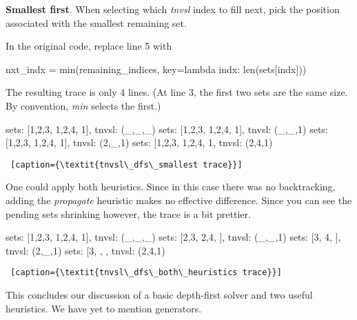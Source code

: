\noindent\textbf{Smallest first}. When selecting which \textit{tnvsl} index to fill next, pick the position associated with the smallest remaining set. 

In the original code, replace line 5 with
\begin{center}
\begin{minipage}[c]{0.45\textwidth}
\begin{python1}
 nxt_indx = min(remaining_indices,
                key=lambda indx: len(sets[indx]))
\end{python1}
\end{minipage}
\end{center}
The resulting trace is only 4 lines. (At line 3, the first two sets are the same size. By convention, \textit{min} selects the first.)

\begin{minipage}[c]{0.45\textwidth}
\begin{python1}  
sets: [{1,2,3}, {1,2,4}, {1}], tnvsl: (_,_,_)
  sets: [{1,2,3}, {1,2,4}, {1}], tnvsl: (_,_,1)
    sets: [{1,2,3}, {1,2,4}, {1}], tnvsl: (2,_,1)
      sets: [{1,2,3}, {1,2,4}, {1}, tnvsl: (2,4,1)
\end{python1}\linv
\begin{lstlisting} [caption={\textit{tnvsl\_dfs\_smallest trace}}]
\end{lstlisting}
\end{minipage}

One could apply both heuristics. Since in this case there was no backtracking, adding the \textit{propagate} heuristic makes no effective difference. Since you can see the pending sets shrinking however, the trace is a bit prettier.

\begin{minipage}[c]{0.45\textwidth}
\begin{python1} 
sets: [{1,2,3}, {1,2,4}, {1}], tnvsl: (_,_,_)
  sets: [{2,3}, {2,4}, {}], tnvsl: (_,_,1)
    sets: [{3}, {4}, {}], tnvsl: (2,_,1)
      sets: [{3}, {}, {}, tnvsl: (2,4,1)
\end{python1}\linv
\begin{lstlisting} [caption={\textit{tnvsl\_dfs\_both\_heuristics trace}}]
\end{lstlisting}
\end{minipage}

This concludes our discussion of a basic depth-first solver and two useful heuristics. We have yet to mention generators.


